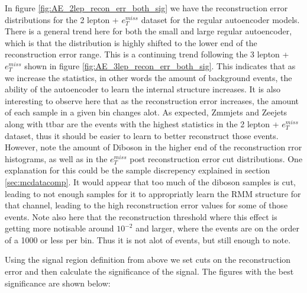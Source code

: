 In figure \ref{fig:AE_2lep_recon_err_both_sig} we have the reconstruction error distributions 
for the 2 lepton + $e_T^{miss}$ dataset for the regular autoencoder models. There is a general 
trend here for both the small and large regular autoencoder, which is that the distribution is 
highly shifted to the lower end of the reconstruction error range. This is a continuing trend 
following the 3 lepton + $e_T^{miss}$ shown in figure 
\ref{fig:AE_3lep_recon_err_both_sig}. This indicates that as we increase the statistics, 
in other words the amount of background events, the ability of the autoencoder to learn the 
internal structure increases. It is also interesting to observe here that 
as the reconstruction error increases, the amount of each sample in a given bin changes alot. 
As expected, Zmmjets and Zeejets along with ttbar are the events with the highest statistics 
in the 2 lepton + $e_T^{miss}$ dataset, thus it should be easier to learn to better reconstruct 
those events. However, note the amount of Diboson in the higher end of the reconstruction 
rror histograms, as well as in the $e_T^{miss}$ post reconstruction error cut distributions. 
One explanation for this could be the sample discrepency explained in section 
\ref{sec:mcdatacomp}. It would appear that too much of the diboson samples is cut, leading to 
not enough samples for it to appropriatly learn the RMM structure for that channel, leading to 
the high reconstruction error values for some of those events. Note also here that the 
reconstruction threshold where this effect is getting more notisable around $10^{-2}$ and 
larger, where the events are on the order of a 1000 or less per bin. Thus it is not alot of 
events, but still enough to note. \par Using the signal region definition from above we set 
cuts on the reconstruction error and then calculate the significance of the signal. 
The figures with the best significance are shown below:

